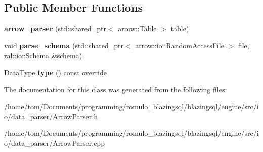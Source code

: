 \subsection*{Public Member Functions}
\begin{DoxyCompactItemize}
\item 
\mbox{\label{classral_1_1io_1_1arrow__parser_a6adb75628c932c35c5144323aed56204}} 
{\bfseries arrow\+\_\+parser} (std\+::shared\+\_\+ptr$<$ arrow\+::\+Table $>$ table)
\item 
\mbox{\label{classral_1_1io_1_1arrow__parser_a64424836e1e59df80a393c77f31d1f2d}} 
void {\bfseries parse\+\_\+schema} (std\+::shared\+\_\+ptr$<$ arrow\+::io\+::\+Random\+Access\+File $>$ file, \hyperlink{classral_1_1io_1_1Schema}{ral\+::io\+::\+Schema} \&schema)
\item 
\mbox{\label{classral_1_1io_1_1arrow__parser_aa01d534dac941d08da9b4b9786e75ada}} 
Data\+Type {\bfseries type} () const override
\end{DoxyCompactItemize}


The documentation for this class was generated from the following files\+:\begin{DoxyCompactItemize}
\item 
/home/tom/\+Documents/programming/romulo\+\_\+blazingsql/blazingsql/engine/src/io/data\+\_\+parser/Arrow\+Parser.\+h\item 
/home/tom/\+Documents/programming/romulo\+\_\+blazingsql/blazingsql/engine/src/io/data\+\_\+parser/Arrow\+Parser.\+cpp\end{DoxyCompactItemize}
